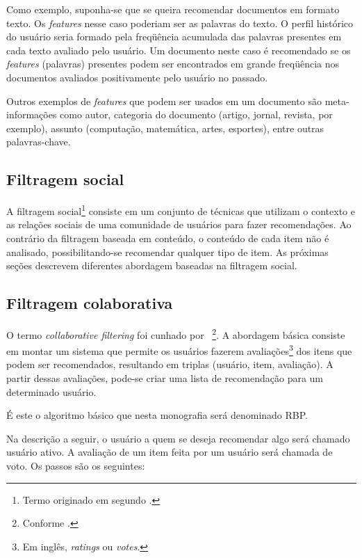 Como exemplo, suponha-se que se queira recomendar documentos em formato texto. Os \textit{features} nesse caso poderiam ser as palavras do texto. O perfil histórico do usuário seria formado pela freqüência acumulada das palavras presentes em cada texto avaliado pelo usuário. Um documento neste caso é recomendado se os \textit{features} (palavras) presentes podem ser encontrados em grande freqüência nos documentos avaliados positivamente pelo usuário no passado.

Outros exemplos de \textit{features} que podem ser usados em um documento são meta-informações como autor, categoria do documento (artigo, jornal, revista, por exemplo), assunto (computação, matemática, artes, esportes), entre outras palavras-chave.


\subsection{Filtragem social} %


A filtragem social\footnote{Termo originado em \cite{Malone87} segundo \cite{Hill95}.} consiste em um conjunto de técnicas que utilizam o contexto e as relações sociais de uma comunidade de usuários para fazer recomendações. Ao contrário da filtragem baseada em conteúdo, o conteúdo de cada item não é analisado, possibilitando-se recomendar qualquer tipo de item. As próximas seções descrevem diferentes abordagem baseadas na filtragem social.

\subsection{Filtragem colaborativa}

O termo \textit{collaborative filtering} foi cunhado por \cite{Goldberg92}~\footnote{Conforme \cite{Resnick97}.}. A abordagem básica consiste em montar um sistema que permite os usuários fazerem avaliações\footnote{Em inglês, \textit{ratings} ou \textit{votes}.} dos itens que podem ser recomendados, resultando em triplas (usuário, item, avaliação). A partir dessas avaliações, pode-se criar uma lista de recomendação para um determinado usuário.

É este o algoritmo básico que nesta monografia será denominado RBP.

Na descrição a seguir, o usuário a quem se deseja recomendar algo será chamado usuário ativo. A avaliação de um item feita por um usuário será chamada de voto. Os passos são os seguintes:

